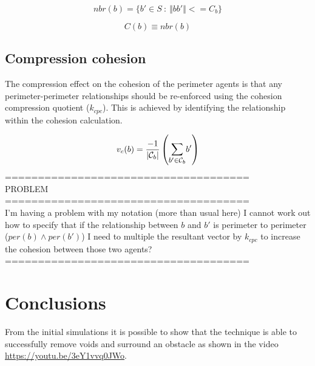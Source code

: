 \documentclass[12pt,a4paper]{article}
\newcommand{\magn}[1]{\Vert{#1}\Vert}
\newcommand{\card}[1]{\vert{#1}\vert}
\begin{document}
\begin{equation}\label{eq:cohesion1}
nbr(b) = \{b' \in S~:~\magn{bb'} <= C_b\}
\end{equation}

\begin{equation}\label{eq:cohesion2}
C(b) \equiv nbr(b)
\end{equation}

\subsection{Compression cohesion}
The compression effect on the cohesion of the perimeter agents is that any perimeter-perimeter relationships should be re-enforced using the cohesion compression quotient ($k_{cpc}$). This is achieved by identifying the relationship within the cohesion calculation.

\begin{equation}\label{eq:cohesion3}
v_c(b) =
\frac{-1}{\card{\mathcal C_b}}\left({\mathlarger{\sum_{b' \in
			\mathcal C_b}}{b'}}\right)
\end{equation}
=====================================\\
PROBLEM\\
=====================================\\
I'm having a problem with my notation (more than usual here) I cannot work out how to specify that if the relationship between $b$ and $b'$ is perimeter to perimeter ($per(b)\wedge per(b')$) I need to multiple the resultant vector by $k_{cpc}$ to increase the cohesion between those two agents?\\ 
=====================================\\

\section{Conclusions}\label{conclusions}
From the initial simulations it is possible to show that the technique is able to successfully remove voids and surround an obstacle as shown in the video \href{https://youtu.be/3eY1vvq0JWo}{https://youtu.be/3eY1vvq0JWo}.



\end{document}
